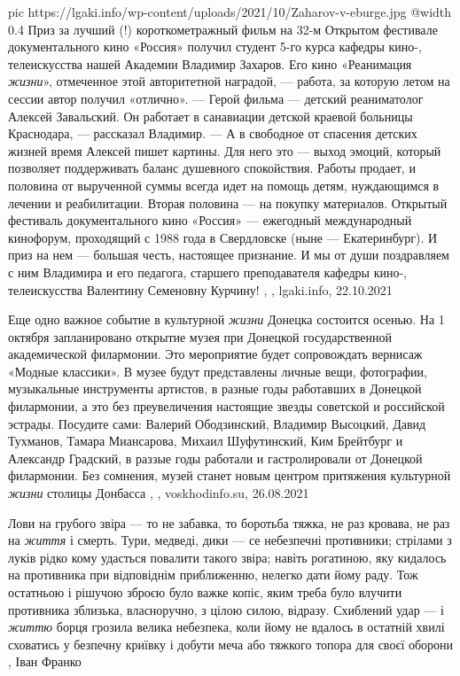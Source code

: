 \ifcmt
  pic https://lgaki.info/wp-content/uploads/2021/10/Zaharov-v-eburge.jpg
  @width 0.4
\fi
Приз за лучший (!) короткометражный фильм на 32-м Открытом фестивале
документального кино «Россия» получил студент 5-го курса кафедры кино-,
телеискусства нашей Академии Владимир Захаров. Его кино «Реанимация
\emph{жизни}», отмеченное этой авторитетной наградой, — работа, за которую
летом на сессии автор получил «отлично».  — Герой фильма — детский реаниматолог
Алексей Завальский. Он работает в санавиации детской краевой больницы
Краснодара, — рассказал Владимир. — А в свободное от спасения детских жизней
время Алексей пишет картины. Для него это — выход эмоций, который позволяет
поддерживать баланс душевного спокойствия. Работы продает, и половина от
вырученной суммы всегда идет на помощь детям, нуждающимся в лечении и
реабилитации. Вторая половина — на покупку материалов.  Открытый фестиваль
документального кино «Россия» — ежегодный международный кинофорум, проходящий с
1988 года в Свердловске (ныне — Екатеринбург). И приз на нем — большая честь,
настоящее признание. И мы от души поздравляем с ним Владимира и его педагога,
старшего преподавателя кафедры кино-, телеискусства Валентину Семеновну
Курчину!
, , lgaki.info, 22.10.2021

Еще одно важное событие в культурной \emph{жизни} Донецка состоится осенью. На
1 октября запланировано открытие музея при Донецкой государственной
академической филармонии. Это мероприятие будет сопровождать вернисаж «Модные
классики».  В музее будут представлены личные вещи, фотографии, музыкальные
инструменты артистов, в разные годы работавших в Донецкой филармонии, а это без
преувеличения настоящие звезды советской и российской эстрады. Посудите сами:
Валерий Ободзинский, Владимир Высоцкий, Давид Тухманов, Тамара Миансарова,
Михаил Шуфутинский, Ким Брейтбург и Александр Градский, в раззые годы работали
и гастролировали от Донецкой филармонии.  Без сомнения, музей станет новым
центром притяжения культурной \emph{жизни} столицы Донбасса
, , voskhodinfo.su, 26.08.2021

Лови на грубого звіра — то не забавка, то боротьба тяжка, не раз кровава, не
раз на \emph{життя} і смерть. Тури, медведі, дики — се небезпечні противники; стрілами
з луків рідко кому удасться повалити такого звіра; навіть рогатиною, яку
кидалось на противника при відповіднім приближенню, нелегко дати йому раду. Тож
остатньою і рішучою зброєю було важке копіє, яким треба було влучити противника
зблизька, власноручно, з цілою силою, відразу. Схиблений удар — і \emph{життю} борця
грозила велика небезпека, коли йому не вдалось в остатній хвилі сховатись у
безпечну криївку і добути меча або тяжкого топора для своєї оборони
, Іван Франко

